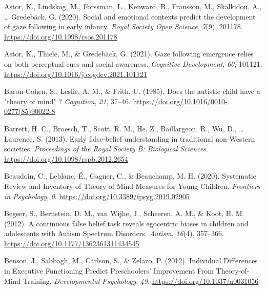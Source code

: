 \documentclass[
  man,floatsintext]{apa7}
\newlength{\cslhangindent}
\newlength{\cslentryspacingunit} %
\newenvironment{CSLReferences}[2] %
 {%
  \setlength{\parindent}{0pt}
  \ifodd #1
  \let\oldpar\par
  \def\par{\hangindent=\cslhangindent\oldpar}
  \fi
  \setlength{\parskip}{#2\cslentryspacingunit}
 }%
 {}
\begin{document}
\hypertarget{refs}{}
\begin{CSLReferences}{1}{0}
\leavevmode{}%
Astor, K., Lindskog, M., Forssman, L., Kenward, B., Fransson, M., Skalkidou, A., \ldots{} Gredebäck, G. (2020). Social and emotional contexts predict the development of gaze following in early infancy. \emph{Royal Society Open Science}, \emph{7}(9), 201178. \url{https://doi.org/10.1098/rsos.201178}

\leavevmode{}%
Astor, K., Thiele, M., \& Gredebäck, G. (2021). Gaze following emergence relies on both perceptual cues and social awareness. \emph{Cognitive Development}, \emph{60}, 101121. \url{https://doi.org/10.1016/j.cogdev.2021.101121}

\leavevmode{}%
Baron-Cohen, S., Leslie, A. M., \& Frith, U. (1985). Does the autistic child have a "theory of mind" ? \emph{Cognition}, \emph{21}, 37--46. \url{https://doi.org/10.1016/0010-0277(85)90022-8}

\leavevmode{}%
Barrett, H. C., Broesch, T., Scott, R. M., He, Z., Baillargeon, R., Wu, D., \ldots{} Laurence, S. (2013). Early false-belief understanding in traditional non-{Western} societies. \emph{Proceedings of the Royal Society B: Biological Sciences}. \url{https://doi.org/10.1098/rspb.2012.2654}

\leavevmode{}%
Beaudoin, C., Leblanc, É., Gagner, C., \& Beauchamp, M. H. (2020). Systematic {Review} and {Inventory} of {Theory} of {Mind Measures} for {Young Children}. \emph{Frontiers in Psychology}, \emph{0}. \url{https://doi.org/10.3389/fpsyg.2019.02905}

\leavevmode{}%
Begeer, S., Bernstein, D. M., van Wijhe, J., Scheeren, A. M., \& Koot, H. M. (2012). A continuous false belief task reveals egocentric biases in children and adolescents with {Autism Spectrum Disorders}. \emph{Autism}, \emph{16}(4), 357--366. \url{https://doi.org/10.1177/1362361311434545}

\leavevmode{}%
Benson, J., Sabbagh, M., Carlson, S., \& Zelazo, P. (2012). Individual {Differences} in {Executive Functioning Predict Preschoolers}' {Improvement From Theory-of-Mind Training}. \emph{Developmental Psychology}, \emph{49}. \url{https://doi.org/10.1037/a0031056}


\end{CSLReferences}
\end{document}
